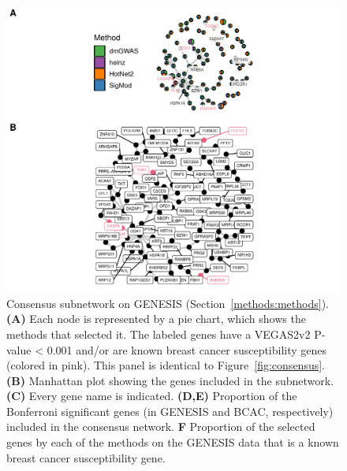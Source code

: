 \documentclass[twocolumn, 11pt]{article}
\begin{document}
\begin{figure}[htbp]
\centering
\includegraphics[width=.9\linewidth]{./figures/sfigure_4.pdf}
\caption{\label{sfig:consensus_names}
Consensus subnetwork on GENESIS (Section~\ref{methods:methods}). \textbf{(A)} Each node is represented by a pie chart, which shows the methods that selected it. The labeled genes have a VEGAS2v2 P-value < 0.001 and/or are known breast cancer susceptibility genes (colored in pink). This panel is identical to Figure~\ref{fig:consensus}. \textbf{(B)} Manhattan plot showing the genes included in the subnetwork. \textbf{(C)} Every gene name is indicated. \textbf{(D,E)} Proportion of the Bonferroni significant genes (in GENESIS and BCAC, respectively) included in the consensus network. \textbf{F} Proportion of the selected genes by each of the methods on the GENESIS data that is a known breast cancer susceptibility gene.}
\end{figure}
\end{document}
